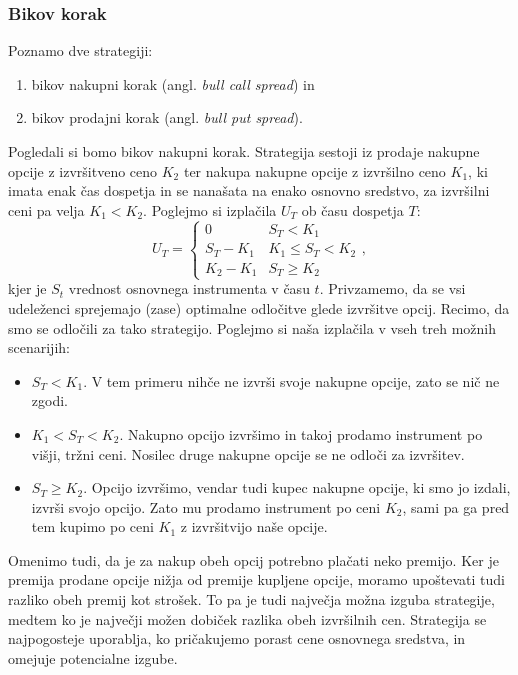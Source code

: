 \documentclass[12pt,a4paper]{amsart}
\theoremstyle{definition} %
\theoremstyle{plain} %
\begin{document}
\subsubsection{Bikov korak}
Poznamo dve strategiji: 
\begin{enumerate}
  \item bikov nakupni korak (angl. \textit{bull call spread}) in 					
  \item bikov prodajni korak (angl. \textit{bull put spread}).
\end{enumerate}
Pogledali si bomo bikov nakupni korak. Strategija sestoji iz prodaje nakupne opcije 			
z izvršitveno ceno $K_2$ ter nakupa nakupne opcije z izvršilno ceno $K_1$, ki imata 
enak čas dospetja in se nanašata na enako osnovno sredstvo, za izvršilni ceni pa velja 
$K_1 < K_2$. Poglejmo si izplačila $U_T$ ob času dospetja $T$:
$$U_T = \begin{cases}
0 & S_T < K_1\\
S_T - K_1 & K_1 \leq S_T < K_2\\
K_2 - K_1 & S_T \geq K_2
\end{cases},$$
kjer je $S_t$ vrednost osnovnega instrumenta v času $t$. Privzamemo, da se vsi 
udeleženci sprejemajo (zase) optimalne odločitve glede izvršitve opcij. Recimo, da smo se 
odločili za tako strategijo. Poglejmo si naša izplačila v vseh treh možnih scenarijih:
\begin{itemize}
  \item $S_T < K_1$. V tem primeru nihče ne izvrši svoje nakupne opcije, zato se 
	nič ne zgodi.
  \item $K_1 < S_T < K_2$. Nakupno opcijo izvršimo in takoj prodamo instrument po 
	višji, tržni ceni. Nosilec druge nakupne opcije se ne odloči za izvršitev.
  \item $S_T \geq K_2$. Opcijo izvršimo, vendar tudi kupec nakupne opcije, ki smo 
	jo izdali, izvrši svojo opcijo. Zato mu prodamo instrument po ceni $K_2$, sami 
	pa ga pred tem kupimo po ceni $K_1$ z izvršitvijo naše opcije. 
\end{itemize}
Omenimo tudi, da je za nakup obeh opcij potrebno plačati neko premijo. Ker je premija
prodane opcije nižja od premije kupljene opcije, moramo upoštevati tudi razliko obeh 
premij kot strošek. To pa je tudi največja možna izguba strategije, medtem ko je največji 
možen dobiček razlika obeh izvršilnih cen. Strategija se najpogosteje uporablja, ko 
pričakujemo porast cene osnovnega sredstva, in omejuje potencialne izgube.
\end{document}
